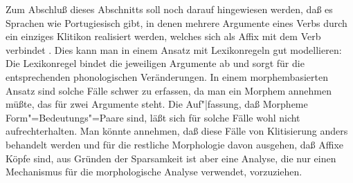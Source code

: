 

Zum Abschluß dieses Abschnitts soll noch darauf hingewiesen werden,
daß es Sprachen wie Portugiesisch gibt, in denen mehrere Argumente eines Verbs
durch ein einziges Klitikon realisiert werden, welches sich als Affix mit dem Verb
verbindet \citep[Kapitel~2.1.1.4 und S.\,169--171]{Crysmann2002a}. 
Dies kann man in einem Ansatz mit Lexikonregeln gut modellieren: Die Lexikonregel bindet die jeweiligen
Argumente ab und sorgt für die entsprechenden phonologischen Veränderungen. In einem morphembasierten
Ansatz sind solche Fälle schwer zu erfassen, da man ein Morphem annehmen müßte, das für zwei Argumente
steht. Die Auf"|fassung, daß Morpheme Form"=Bedeutungs"=Paare sind, läßt sich für solche Fälle wohl nicht
aufrechterhalten.
Man könnte annehmen, daß diese Fälle von Klitisierung anders behandelt werden und für die
restliche Morphologie davon ausgehen, daß Affixe Köpfe sind, aus Gründen der Sparsamkeit ist aber
eine Analyse, die nur einen Mechanismus für die morphologische Analyse verwendet, vorzuziehen.%

